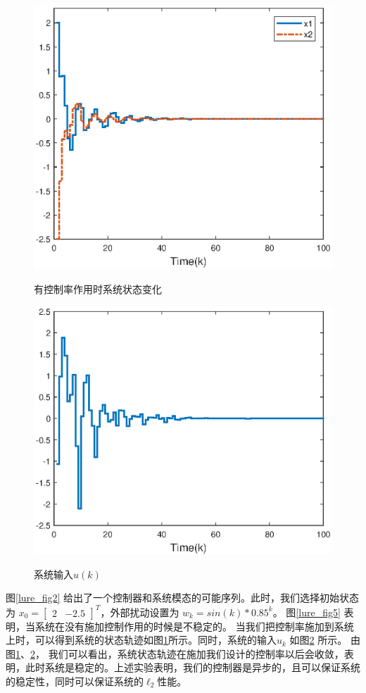 \begin{figure}[!htb]
	\centering\includegraphics[scale=0.6]{./figures/lure_system/state4.eps}\\
	\caption{有控制率作用时系统状态变化}
	\label{lure_fig3}
\end{figure}
\begin{figure}[!htb]
	\centering\includegraphics[scale=0.6]{./figures/lure_system/u_k3.eps}\\ 
	\caption{系统输入$u(k)$}
	\label{lure_fig4}
\end{figure}
图\ref{lure_fig2} 给出了一个控制器和系统模态的可能序列。此时，我们选择初始状态为 $x_{0}=\begin{bmatrix}
2&-2.5
\end{bmatrix}^{T}$，外部扰动设置为 $w_{k} = sin(k)*0.85^{k}$。 图\ref{lure_fig5} 表明，当系统在没有施加控制作用的时候是不稳定的。 当我们把控制率施加到系统上时，可以得到系统的状态轨迹如图\ref{lure_fig3}所示。同时，系统的输入$u_{k}$ 如图\ref{lure_fig4} 所示。 由图\ref{lure_fig3}、\ref{lure_fig4}， 我们可以看出，系统状态轨迹在施加我们设计的控制率以后会收敛，表明，此时系统是稳定的。上述实验表明，我们的控制器是异步的，且可以保证系统的稳定性，同时可以保证系统的$\ell_2$性能。



